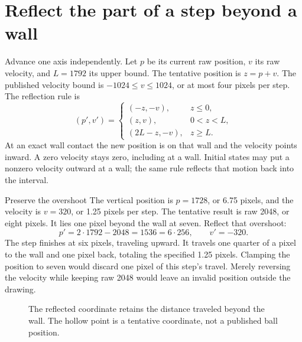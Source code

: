 \section{Reflect the part of a step beyond a wall}
Advance one axis independently. Let \(p\) be its current raw position,
\(v\) its raw velocity, and \(L=1792\) its upper bound. The tentative position is
\(z=p+v\). The published velocity bound is \(-1024\leq v\leq1024\), or at most
four pixels per step. The reflection rule is
\[
  (p',v')=
  \begin{cases}
    (-z,-v),   & z\leq0,  \\
    (z,v),     & 0<z<L,   \\
    (2L-z,-v), & z\geq L.
  \end{cases}
\]
At an exact wall contact the new position is on that wall and the velocity points
inward. A zero velocity stays zero, including at a wall. Initial states may put
a nonzero velocity outward at a wall; the same rule reflects that motion back
into the interval.

\begin{MARSWorkedExample}{Preserve the overshoot}
  The vertical position is \(p=1728\), or 6.75 pixels, and the velocity is
  \(v=320\), or 1.25 pixels per step. The tentative result is raw 2048, or eight
  pixels. It lies one pixel beyond the wall at seven. Reflect that overshoot:
  \[
    p'=2\cdot1792-2048=1536=6\cdot256,\qquad v'=-320.
  \]
  The step finishes at six pixels, traveling upward. It travels one quarter of a
  pixel to the wall and one pixel back, totaling the specified 1.25 pixels. Clamping the position to seven
  would discard one pixel of this step's travel. Merely reversing the velocity
  while keeping raw 2048 would leave an invalid position outside the drawing.
\end{MARSWorkedExample}

\begin{figure}[htbp]
  \centering
  \caption{The reflected coordinate retains the distance traveled beyond the wall. The hollow point is a tentative coordinate, not a published ball position.}
\end{figure}

